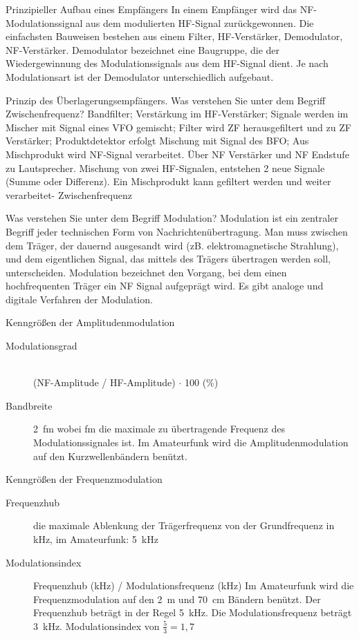 \documentclass[avery5371,grid,frame,a4paper]{flashcards}
\newcommand{\card}[3]{
  \begin{flashcard}[{\chap} -- #1]{#2}#3\end{flashcard}
}
\begin{document}
\card{13}{Prinzipieller Aufbau eines Empfängers}{
  In einem Empfänger wird das NF-Modulationssignal aus dem modulierten HF-Signal zurückgewonnen.
  Die einfachsten Bauweisen bestehen aus einem Filter, HF-Verstärker, Demodulator, NF-Verstärker.
  Demodulator bezeichnet eine Baugruppe, die der Wiedergewinnung des Modulationssignals aus dem HF-Signal dient. Je nach Modulationsart ist der Demodulator unterschiedlich aufgebaut.
}
\card{14}{Prinzip des Überlagerungsempfängers. Was verstehen Sie unter dem Begriff Zwischenfrequenz?}{
  Bandfilter; Verstärkung im HF-Verstärker; Signale werden im Mischer mit Signal eines VFO gemischt; Filter wird ZF herausgefiltert und zu ZF Verstärker; Produktdetektor erfolgt Mischung mit Signal des BFO; Aus Mischprodukt wird NF-Signal verarbeitet. Über NF Verstärker und NF Endstufe zu Lautsprecher.
  Mischung von zwei HF-Signalen, entstehen 2 neue Signale (Summe oder Differenz). Ein Mischprodukt kann gefiltert werden und weiter verarbeitet- Zwischenfrequenz} %
\card{16}{Was verstehen Sie unter dem Begriff Modulation?}{
  Modulation ist ein zentraler Begriff jeder technischen Form von Nachrichtenübertragung. Man muss zwischen dem Träger, der dauernd ausgesandt wird (zB. elektromagnetische Strahlung), und dem eigentlichen Signal, das mittels des Trägers übertragen werden soll, unterscheiden. Modulation bezeichnet den Vorgang, bei dem einen hochfrequenten Träger ein NF Signal aufgeprägt wird. Es gibt analoge und digitale Verfahren der Modulation.}
\card{17}{Kenngrößen der Amplitudenmodulation}{
  \begin{description}
    \item[Modulationsgrad] \hfill{} \\ (NF-Amplitude / HF-Amplitude) $\cdot$ 100 (\%)
    \item[Bandbreite]
      2~fm wobei fm die maximale zu übertragende Frequenz des Modulationssignales ist.
      Im Amateurfunk wird die Amplitudenmodulation auf den Kurzwellenbändern benützt.
  \end{description}
}
\card{18}{Kenngrößen der Frequenzmodulation}{
  \begin{description}
    \item[Frequenzhub] die maximale Ablenkung der Trägerfrequenz von der Grundfrequenz in kHz,
      im Amateurfunk: 5~kHz
    \item[Modulationsindex]
      Frequenzhub (kHz) / Modulationsfrequenz (kHz)
      Im Amateurfunk wird die Frequenzmodulation auf den 2~m und 70~cm Bändern benützt.
      Der Frequenzhub beträgt in der Regel 5~kHz. Die Modulationsfrequenz beträgt 3~kHz.
      Modulationsindex von $\frac53 = 1,7$
  \end{description}
}
\end{document}
